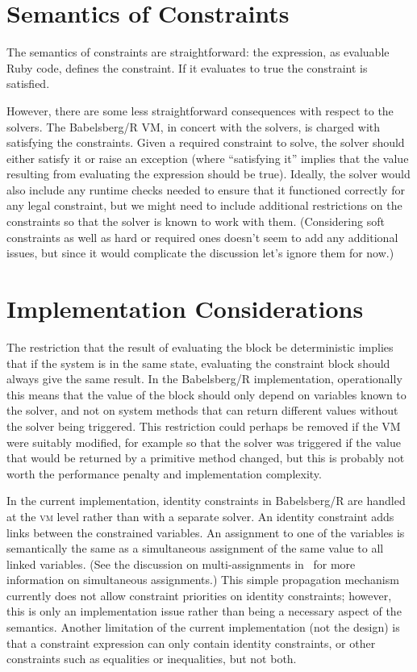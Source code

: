 \documentclass{article}
\begin{document}
\section{Semantics of Constraints}

The semantics of constraints are straightforward: the expression, as
evaluable Ruby code, defines the constraint.  If it evaluates to true
the constraint is satisfied.

However, there are some less straightforward consequences with respect
to the solvers.  The Babelsberg/R VM, in concert with the solvers, is
charged with satisfying the constraints.  Given a required constraint
to solve, the solver should either satisfy it or raise an exception
(where ``satisfying it'' implies that the value resulting from
evaluating the expression should be true).  Ideally, the solver would
also include any runtime checks needed to ensure that it functioned
correctly for any legal constraint, but we might need to include
additional restrictions on the constraints so that the solver is known
to work with them.  (Considering soft constraints as well as hard or
required ones doesn't seem to add any additional issues, but since it
would complicate the discussion let's ignore them for now.)

\section{Implementation Considerations}
\label{sec:implementation}

The restriction that the result of evaluating the block be
deterministic implies that if the system is in the same state,
evaluating the constraint block should always give the same result.
In the Babelsberg/R implementation, operationally this means that the
value of the block should only depend on variables known to the
solver, and not on system methods that can return different values
without the solver being triggered.  This restriction could perhaps be
removed if the VM were suitably modified, for example so that the
solver was triggered if the value that would be returned by a
primitive method changed, but this is probably not worth the
performance penalty and implementation complexity.

In the current implementation, identity constraints in Babelsberg/R
are handled at the \textsc{vm} level rather than with a separate
solver.  An identity constraint adds links between the constrained
variables. An assignment to one of the variables is semantically the
same as a simultaneous assignment of the same value to all linked
variables.  (See the discussion on multi-assignments
in~\cite{felgentreff-babelsberg-tr} for more information on
simultaneous assignments.)  This simple propagation mechanism
currently does not allow constraint priorities on identity
constraints; however, this is only an implementation issue rather than
being a necessary aspect of the semantics.  Another limitation of the
current implementation (not the design) is that a constraint
expression can only contain identity constraints, or other constraints
such as equalities or inequalities, but not both.  
\end{document}
